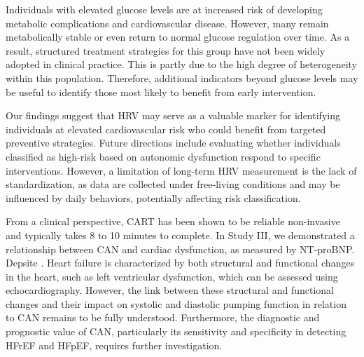 \documentclass[
  a4paper,
  headsepline=true,
  open=any]{scrbook}
\begin{document}
Individuals with elevated glucose levels are at increased risk of
developing metabolic complications and cardiovascular disease. However,
many remain metabolically stable or even return to normal glucose
regulation over time. As a result, structured treatment strategies for
this group have not been widely adopted in clinical practice. This is
partly due to the high degree of heterogeneity within this population.
Therefore, additional indicators beyond glucose levels may be useful to
identify those most likely to benefit from early intervention.

Our findings suggest that HRV may serve as a valuable marker for
identifying individuals at elevated cardiovascular risk who could
benefit from targeted preventive strategies. Future directions include
evaluating whether individuals classified as high-risk based on
autonomic dysfunction respond to specific interventions. However, a
limitation of long-term HRV measurement is the lack of standardization,
as data are collected under free-living conditions and may be influenced
by daily behaviors, potentially affecting risk classification.

From a clinical perspective, CART has been shown to be reliable
non-invasive and typically takes 8 to 10 minutes to complete. In Study
III, we demonstrated a relationship between CAN and cardiac dysfunction,
as measured by NT-proBNP. Depsite . Heart failure is characterized by
both structural and functional changes in the heart, such as left
ventricular dysfunction, which can be assessed using echocardiography.
However, the link between these structural and functional changes and
their impact on systolic and diastolic pumping function in relation to
CAN remains to be fully understood. Furthermore, the diagnostic and
prognostic value of CAN, particularly its sensitivity and specificity in
detecting HFrEF and HFpEF, requires further investigation.
\end{document}
